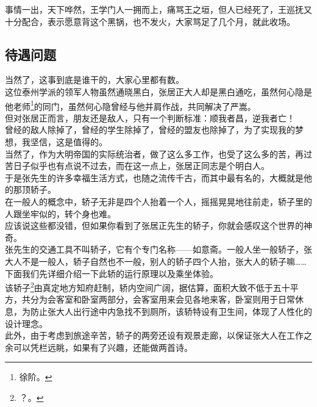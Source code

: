\begin{multicols}{\theparacolNo}
事情一出，天下哗然，王学门人一拥而上，痛骂王之垣，但人已经死了，王巡抚又十分配合，表示愿意背这个黑锅，也不发火，大家骂足了几个月，就此收场。\\

\subsection{待遇问题}
当然了，这事到底是谁干的，大家心里都有数。\\

这位泰州学派的领军人物虽然通晓黑白，张居正大人却是黑白通吃，虽然何心隐是他老师\footnote{徐阶。}的同门，虽然何心隐曾经与他并肩作战，共同解决了严嵩。\\

但对张居正而言，朋友还是敌人，只有一个判断标准：顺我者昌，逆我者亡！\\

曾经的敌人除掉了，曾经的学生除掉了，曾经的盟友也除掉了，为了实现我的梦想，我坚信，这是值得的。\\

当然了，作为大明帝国的实际统治者，做了这么多工作，也受了这么多的苦，再过苦日子似乎也有点说不过去，而在这一点上，张居正同志是个明白人。\\

于是张先生的许多幸福生活方式，也随之流传千古，而其中最有名的，大概就是他的那顶轿子。\\

在一般人的概念中，轿子无非是四个人抬着一个人，摇摇晃晃地往前走，轿子里的人跟坐牢似的，转个身也难。\\

应该说这些都没错，但如果你看到了张居正先生的轿子，你就会感叹这个世界的神奇。\\

张先生的交通工具不叫轿子，它有个专门名称——如意斋。一般人坐一般轿子，张大人不是一般人，轿子自然也不一般，别人的轿子四个人抬，张大人的轿子嘛……\\

下面我们先详细介绍一下此轿的运行原理以及乘坐体验。\\

该轿子\footnote{？。}由真定地方知府赶制，轿内空间广阔，据估算，面积大致不低于五十平方，共分为会客室和卧室两部分，会客室用来会见各地来客，卧室则用于日常休息，为防止张大人出行途中内急找不到厕所，该轿特设有卫生间，体现了人性化的设计理念。\\

此外，由于考虑到旅途辛苦，轿子的两旁还设有观景走廊，以保证张大人在工作之余可以凭栏远眺，如果有了兴趣，还能做两首诗。\\


\end{multicols}
